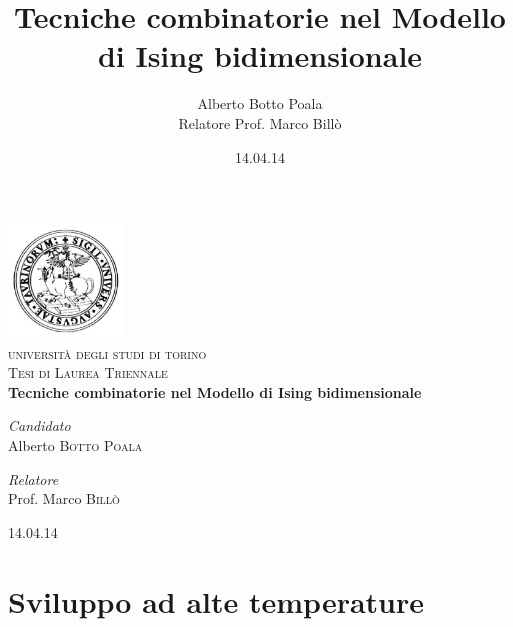 \documentclass[11pt]{article}
\title{Tecniche combinatorie nel Modello di Ising bidimensionale}
\author{Alberto Botto Poala\\
Relatore Prof. Marco Billò}
\date{14.04.14}
\begin{document}
\begin{titlepage}
\begin{center}

\includegraphics[width=0.23\textwidth]{unito}~\\[1cm]


\textsc{\LARGE università degli studi di torino}\\[1.8cm]

\textsc{\Large Tesi di Laurea Triennale}\\[0.5cm]


{ \huge \bfseries Tecniche combinatorie nel Modello di Ising bidimensionale \\[0.5cm] }



\begin{minipage}{0.4\textwidth}
\begin{flushleft} \large
\emph{Candidato}\\
Alberto \textsc{Botto Poala}
\end{flushleft}
\end{minipage}
\begin{minipage}{0.4\textwidth}
\begin{flushright} \large
\emph{Relatore} \\
Prof. Marco \textsc{Billò}
\end{flushright}
\end{minipage}

\vfill

{14.04.14}

\end{center}
\end{titlepage}


\maketitle
\section{Sviluppo ad alte temperature}
\end{document}
